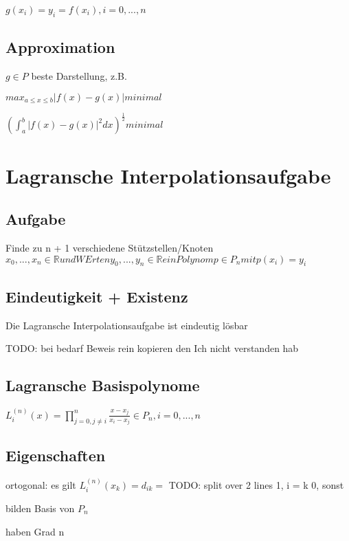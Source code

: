 \documentclass[12pt,a4paper]{article} %
\begin{document}
		$g(x_i) = y_i = f(x_i), i = 0, ..., n$
		
		\subsection{Approximation}
		
		$g \in P$ beste Darstellung, z.B. 
		
		$max_{a \le x \le b}|f(x) - g(x)| minimal$
		
		$(\int_{a}^{b}|f(x) - g(x)|^2dx)^{\frac{1}{2}} minimal$
		
		\newpage
		
		\section{Lagransche Interpolationsaufgabe}
		
		\subsection{Aufgabe}
		
		Finde zu n + 1 verschiedene Stützstellen/Knoten $x_0, ..., x_n \in \mathbb{R} und WErten y_0, ..., y_n \in \mathbb{R} ein Polynom p \in P_n mit p(x_i) = y_i$
		
		\subsection{Eindeutigkeit + Existenz}
		
		Die Lagransche Interpolationsaufgabe ist eindeutig lösbar
		
		TODO: bei bedarf Beweis rein kopieren den Ich nicht verstanden hab
		
		\subsection{Lagransche Basispolynome}
		
		$L_i^{(n)}(x) = \prod_{j = 0, j \ne i}^{n} \frac{x - x_j}{x_i - x_j} \in P_n, i = 0, ..., n$
		
		\subsection{Eigenschaften}
		
		ortogonal: es gilt $L_i^{(n)}(x_k) = d_{ik} =$ TODO: split over 2 lines    1, i = k 0, sonst
		
		bilden Basis von $P_n$
		
		haben Grad n
		
\end{document}
